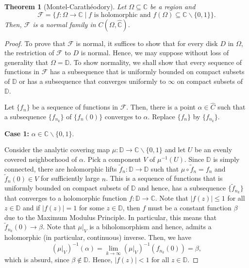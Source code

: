 \documentclass[12pt]{article}
\theoremstyle{thmstyle}
\newtheorem{theorem}{Theorem}[section]
\theoremstyle{defstyle}
\newcommand{\bbC}{\mathbb{C}}
\newcommand{\wt}[1]{\widetilde{#1}}
\newcommand{\wh}[1]{\widehat{#1}}
\renewcommand{\le}{\leqslant}
\newcommand{\bbD}{\mathbb{D}}
\begin{document}
\begin{theorem}[Montel-Carath\'eodory]
    Let $\Omega\subseteq\bbC$ be a region and 
    \begin{equation*}
        \mathscr F = \{f:\Omega\to\bbC\mid f\text{ is holomorphic and } f(\Omega)\subseteq\bbC\backslash\{0,1\}\}.
    \end{equation*}
    Then, $\mathscr F$ is a normal family in $C(\Omega,\wh\bbC)$.
\end{theorem}
\begin{proof}
    To prove that $\mathscr F$ is normal, it suffices to show that for every disk $D$ in $\Omega$, the restriction of $\mathscr F$ to $D$ is normal. Hence, we may suppose without loss of generality that $\Omega = \bbD$. To show normality, we shall show that every sequence of functions in $\mathscr F$ has a subsequence that is uniformly bounded on compact subsets of $\bbD$ or has a subsequence that converges uniformly to $\infty$ on compact subsets of $\bbD$.

    Let $\{f_n\}$ be a sequence of functions in $\mathscr F$. Then, there is a point $\alpha\in\wh C$ such that a subsequence $\{f_{n_k}\}$ of $\{f_n(0)\}$ converges to $\alpha$. Replace $\{f_n\}$ by $\{f_{n_k}\}$.

    \noindent\textbf{Case 1:} $\alpha\in\bbC\backslash\{0,1\}$.

    Consider the analytic covering map $\mu:\bbD\to\bbC\backslash\{0,1\}$ and let $U$ be an evenly covered neighborhood of $\alpha$. Pick a component $V$ of $\mu^{-1}(U)$. Since $\bbD$ is simply connected, there are holomorphic lifts $\wt f_n: \bbD\to\bbD$ such that $\mu\circ\wt f_n = f_n$ and $\wt f_n(0)\in V$ for sufficiently large $n$. This is a sequence of functions that is uniformly bounded on compact subsets of $\bbD$ and hence, has a subsequence $\{\wt f_{n_k}\}$ that converges to a holomorphic function $f:\bbD\to\bbC$. Note that $|f(z)|\le 1$ for all $z\in\bbD$ and if $|f(z)| = 1$ for some $z\in\bbD$, then $f$ must be a constant function $\beta$ due to the Maximum Modulus Principle. In particular, this means that $\wt f_{n_k}(0)\to\beta$. Note that $\mu|_V$ is a biholomorphism and hence, admits a holomorphic (in particular, continuous) inverse. Then, we have 
    \begin{equation*}
        (\mu|_V)^{-1}(\alpha) = \lim_{k\to\infty}(\mu|_V)^{-1}(f_{n_k}(0)) = \beta,
    \end{equation*}
    which is absurd, since $\beta\notin\bbD$. Hence, $|f(z)| < 1$ for all $z\in\bbD$.


\end{proof}
\end{document}
